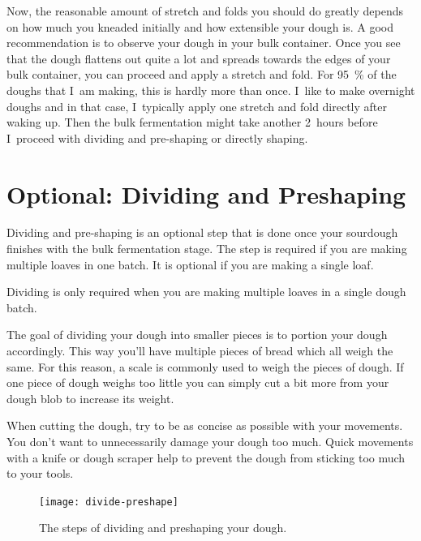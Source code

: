 Now, the reasonable amount of stretch and folds you should do greatly depends on how much you
kneaded initially and how extensible your dough is. A good recommendation is
to observe your dough in your bulk container. Once you see that the dough
flattens out quite a lot and spreads towards the edges of your bulk container,
you can proceed and apply a stretch and fold. For \qty{95}{\percent} of the doughs
that I~am making, this is hardly more than once. I~like to make overnight
doughs and in that case, I~typically apply one stretch and fold directly after
waking up. Then the bulk fermentation might take another 2~hours before I~proceed
with dividing and pre-shaping or directly shaping.

\section{Optional: Dividing and Preshaping}

Dividing and pre-shaping is an optional step that is done
once your sourdough finishes with the bulk fermentation stage.
The step is required if you are making multiple loaves in one
batch. It is optional if you are making a single loaf.

\begin{flowchart}[!htb]
\begin{center}
  
  \caption[Is dividing your dough required check]{Dividing is only required when you are
      making multiple loaves in a single dough batch.}%
  \label{fig:dividing-decision-tree}
\end{center}
\end{flowchart}

The goal of dividing your dough into smaller pieces is to portion
your dough accordingly. This way you'll have multiple pieces of bread
which all weigh the same. For this reason, a scale is commonly
used to weigh the pieces of dough. If one piece of dough weighs
too little you can simply cut a bit more from your dough blob
to increase its weight.

When cutting the dough, try to be as concise as possible with your
movements. You don't want to unnecessarily damage your dough too much.
Quick movements with a knife or dough scraper help to prevent the
dough from sticking too much to your tools.

\begin{figure}[!htb]
  \texttt{[image: divide-preshape]}
  \caption{The steps of dividing and preshaping your dough.}
\end{figure}

